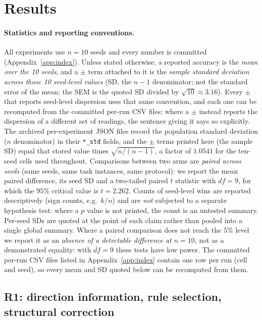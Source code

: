 \documentclass[preprint,12pt]{elsarticle}
\begin{document}
\section{Results}
\label{sec:results}

\paragraph{Statistics and reporting conventions.} All experiments use
$n=10$ seeds and every number is committed (Appendix~\ref{app:index}).
Unless stated otherwise, a reported accuracy is the \emph{mean over the 10
seeds}, and a $\pm$ term attached to it is the \emph{sample standard
deviation across those 10 seed-level values} (SD, the $n-1$ denominator;
not the standard error of the mean; the SEM is the quoted SD divided by
$\sqrt{10}\approx3.16$). Every $\pm$ that reports seed-level dispersion uses that same convention, and each one can be recomputed from the committed per-run CSV files;
where a $\pm$ instead reports the dispersion of a different set of readings, the sentence giving it says so explicitly. The archived
per-experiment JSON files record the population standard deviation ($n$
denominator) in their \texttt{*\_std} fields, and the $\pm$ terms printed here
(the sample SD) equal that stored value times $\sqrt{n/(n-1)}$, a factor of
$1.0541$ for the ten-seed cells used throughout. Comparisons between two
arms are \emph{paired across seeds} (same seeds, same task instances, same
protocol): we report the mean paired difference, its seed SD and a
two-tailed paired $t$ statistic with $df=9$, for which the $95\%$ critical
value is $t=2.262$. Counts of seed-level wins are reported descriptively
(sign counts, e.g.\ $k/n$) and are \emph{not} subjected to a separate
hypothesis test: where a $p$ value is not printed, the count is an
untested summary. Per-seed SDs are quoted at the point of each claim
rather than pooled into a single global summary. Where a paired comparison
does not reach the $5\%$ level we report it as an \emph{absence of a
detectable difference at $n=10$}, not as a demonstrated equality: with
$df=9$ these tests have low power. The committed per-run CSV files listed in
Appendix~\ref{app:index} contain one row per run (cell and seed), so every
mean and SD quoted below can be recomputed from them.

\subsection{R1: direction information, rule selection, structural
correction}
\label{sec:r1}
\end{document}
